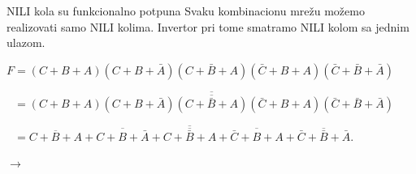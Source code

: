 \begin{frame}[label=02-s026]{NILI kola su funkcionalno potpuna}
\setlength{\parskip}{0pt}
\setlength{\baselineskip}{12pt}
\alert{Svaku kombinacionu mrežu možemo realizovati samo NILI kolima.}
Invertor pri tome smatramo NILI kolom sa jednim ulazom.
\par
\par
\noindent\(F=(C+B+A)(C+B+\bar A)(C+\bar B+A)(\bar C+B+A)(\bar C+\bar B+\bar A)\)\par
\noindent\(\phantom{F} =\overline{\overline{(C+B+A)(C+B+\bar A)(C+\bar B+A)(\bar C+B+A)(\bar C+\bar B+\bar A)}}\)\par
\noindent\(\phantom{F} =\overline{\overline{C+B+A}+\overline{C+B+\bar A}+\overline{C+\bar B+A}+\overline{\bar C+B+A}+\overline{\bar C+\bar B+\bar A}}\).\par
\vspace{.5mm}

\centering

\(\longrightarrow\)
\par
\end{frame}
